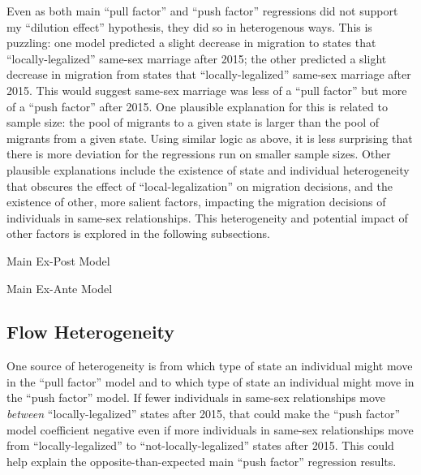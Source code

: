 \documentclass[12pt,letterpaper]{article}
\begin{document}
Even as both main “pull factor” and “push factor”  regressions did not support my “dilution effect” hypothesis, they did so in heterogenous ways. This is puzzling: one model predicted a slight decrease in migration to states that “locally-legalized” same-sex marriage after 2015; the other predicted a slight decrease in migration from states that “locally-legalized” same-sex marriage after 2015. This would suggest same-sex marriage was less of a “pull factor” but more of a “push factor” after 2015. One plausible explanation for this is related to sample size: the pool of migrants to a given state is larger than the pool of migrants from a given state. Using similar logic as above, it is less surprising that there is more deviation for the regressions run on smaller sample sizes. Other plausible explanations include the existence of state and individual heterogeneity that obscures the effect of “local-legalization” on migration decisions, and the existence of other, more salient factors, impacting the migration decisions of individuals in same-sex relationships. This heterogeneity and potential impact of other factors is explored in the following subsections. 

\begin{table}[h]
    \centering
    \caption{Main Ex-Post Model}
    \label{tab: expost_model}
    
\end{table}
\begin{table}[h]
    \centering
    \caption{Main Ex-Ante Model}
    \label{tab: exante_model}
    
\end{table}

\clearpage
\subsection{Flow Heterogeneity}

One source of heterogeneity is from which type of state an individual might move in the “pull factor” model and to which type of state an individual might move in the “push factor” model. If fewer individuals in same-sex relationships move \textit{between} “locally-legalized” states after 2015, that could make the “push factor” model coefficient negative even if more individuals in same-sex relationships move from “locally-legalized” to “not-locally-legalized” states after 2015. This could help explain the opposite-than-expected main “push factor” regression results.
\end{document}
